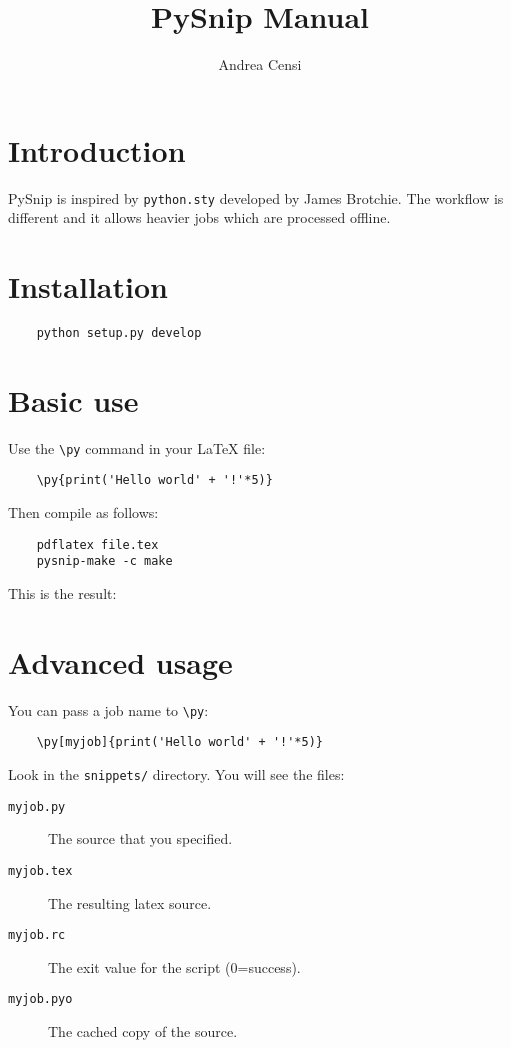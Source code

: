 \documentclass{article}
\title{ PySnip Manual}
\author{Andrea Censi}
\newcommand{\cmd}[1]{\texttt{\textbackslash #1}}
\begin{document}
\maketitle

\section{Introduction}

PySnip is inspired by \texttt{python.sty} developed by James Brotchie.
The workflow is different and it allows heavier jobs which are processed
offline.


\section{Installation}

\begin{verbatim}
    python setup.py develop
\end{verbatim}

\section{Basic use}

Use the \cmd{py} command in your LaTeX file:
\begin{verbatim}
    \py{print('Hello world' + '!'*5)}
\end{verbatim}

Then compile as follows:
\begin{verbatim}
    pdflatex file.tex
    pysnip-make -c make
\end{verbatim}

This is the result:
\begin{quote}
\end{quote}


\section{Advanced usage}

You can pass a job name to \cmd{py}:
\begin{verbatim}
    \py[myjob]{print('Hello world' + '!'*5)}
\end{verbatim}

Look in the \texttt{snippets/} directory. You will see the files:

\begin{description}
\item[\texttt{myjob.py}] The source that you specified.
\item[\texttt{myjob.tex}] The resulting latex source.
\item[\texttt{myjob.rc}] The exit value for the script (0=success).
\item[\texttt{myjob.pyo}]  The cached copy of the source.
\end{description}
\end{document}
